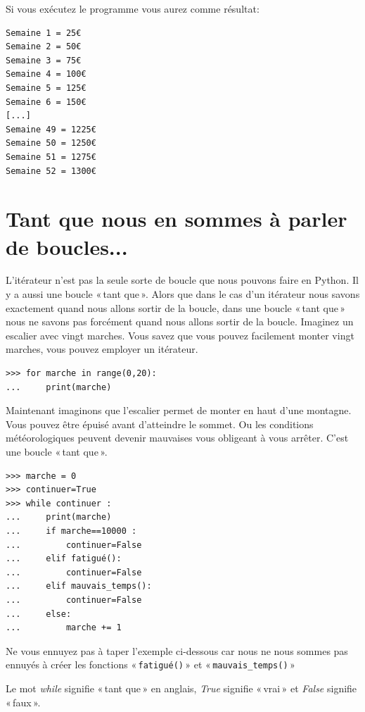 Si vous exécutez le programme vous aurez comme résultat:

\begin{Verbatim}[frame=single,rulecolor=\color{gray}, label=ne pas saisir]
Semaine 1 = 25€
Semaine 2 = 50€
Semaine 3 = 75€
Semaine 4 = 100€
Semaine 5 = 125€
Semaine 6 = 150€
[...]
Semaine 49 = 1225€
Semaine 50 = 1250€
Semaine 51 = 1275€
Semaine 52 = 1300€
\end{Verbatim}

\section{Tant que nous en sommes à parler de boucles...}

L'itérateur n'est pas la seule sorte de boucle que nous pouvons faire en Python.  Il y a aussi une boucle « tant que ». Alors que dans le cas d'un itérateur nous savons exactement quand nous allons sortir de la boucle, dans une boucle « tant que » nous ne savons pas forcément quand nous allons sortir de la boucle.  Imaginez un escalier avec vingt marches. Vous savez que vous pouvez facilement monter vingt marches, vous pouvez employer un itérateur.

\begin{Verbatim}[frame=single,rulecolor=\color{gray}, label=ne pas saisir]
>>> for marche in range(0,20):
...     print(marche)
\end{Verbatim}

Maintenant imaginons que l'escalier permet de monter en haut d'une montagne. Vous pouvez être épuisé avant d'atteindre le sommet. Ou les conditions météorologiques peuvent devenir mauvaises vous obligeant à vous arrêter.
C'est une boucle « tant que ».

\begin{Verbatim}[frame=single,rulecolor=\color{gray}, label=ne pas saisir]
>>> marche = 0
>>> continuer=True
>>> while continuer :
...     print(marche)
...     if marche==10000 :
...         continuer=False
...     elif fatigué():
...         continuer=False
...     elif mauvais_temps():
...         continuer=False
...     else:
...         marche += 1
\end{Verbatim}

Ne vous ennuyez pas à taper l'exemple ci-dessous car nous ne nous sommes pas ennuyés à créer les fonctions « \texttt{fatigué()} » et « \texttt{mauvais\_temps()} » 

Le mot \emph{while} signifie « tant que » en anglais, \emph{True} signifie « vrai » et \emph{False} signifie « faux ».

